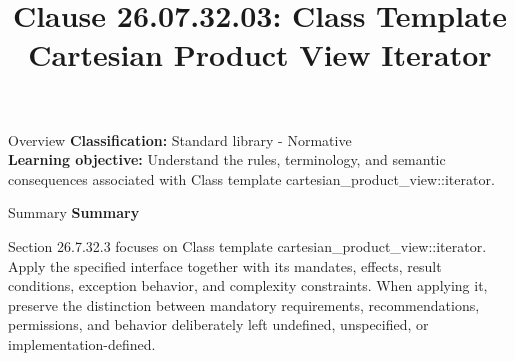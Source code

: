 \documentclass[10pt,letterpaper]{article}
\title{Clause 26.07.32.03: Class Template Cartesian Product View Iterator}
\author{}
\date{}
\begin{document}
\maketitle
\begin{CornellOverviewBox}{Overview}
\textbf{Classification:} Standard library - Normative\\[2pt]
\textbf{Learning objective:} Understand the rules, terminology, and semantic consequences associated with Class template cartesian\_product\_view::iterator.
\end{CornellOverviewBox}\begin{CornellSummaryBox}{Summary}
{\sffamily\bfseries\color{Accent} Summary}\par\vspace{3pt}Section 26.7.32.3 focuses on Class template cartesian\_product\_view::iterator. Apply the specified interface together with its mandates, effects, result conditions, exception behavior, and complexity constraints. When applying it, preserve the distinction between mandatory requirements, recommendations, permissions, and behavior deliberately left undefined, unspecified, or implementation-defined.
\end{CornellSummaryBox}
\end{document}

